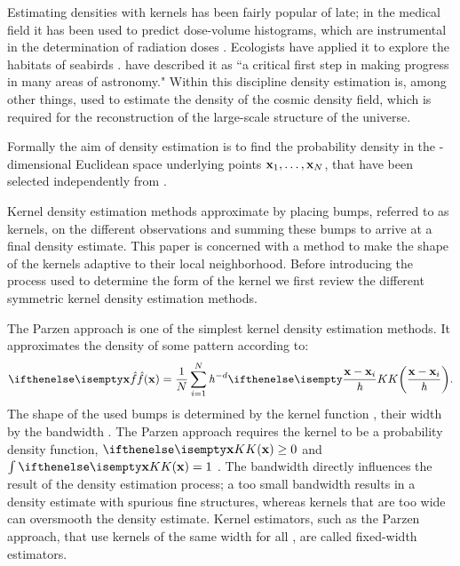 Estimating densities with kernels has been fairly popular of late; in the medical field it has been used to predict dose-volume histograms, which are instrumental in the determination of radiation doses \cite{SkarpmanDose2015}. Ecologists have applied it to explore the habitats of seabirds \cite{lees2016using}. \textcite{ferdosi2011comparison} have described it as ``a critical first step in making progress in many areas of astronomy."  Within this discipline  density estimation is, among other things, used to estimate the density of the cosmic density field, which is required for the reconstruction of the large-scale structure of the universe.

Formally the aim of density estimation is to find the probability density \varDensityFunction{\varPattern} in the \varDim-dimensional Euclidean space underlying \varNumPatterns points $\varPattern[1], \dotsc, \varPattern[\varNumPatterns]$, that have been selected independently from \varDensityFunction{\varPattern}. 

Kernel density estimation methods approximate \varDensityFunction{\varPattern} by placing bumps, referred to as kernels, on the different observations and summing these bumps to arrive at a final density estimate. This paper is concerned with a method to make the shape of the kernels adaptive to their local neighborhood. Before introducing the process used to determine the form of the kernel we first review the different symmetric kernel density estimation methods.

	The Parzen approach \cite{parzen1962estimation} is one of the simplest kernel density estimation methods. It approximates the density of some pattern \varPattern according to:
	\begin{equation}\label{eq:1:parzen}
		\varEstimatedDensityFunction{\varPattern} = \frac{1}{\varNumPatterns}\sum_{\itXis = 1}^{\varNumPatterns} \varBandwidth^{-\varDim}\varKernel{\frac{\varPattern - \varPattern[\itXis]}{\varBandwidth}}.
	\end{equation}
	The shape of the used bumps is determined by the kernel function \varKernel{\bullet}, their width by the bandwidth \varBandwidth. The Parzen approach requires the kernel to be a probability density function, \ie $\varKernel{\varPattern} \geq 0$ and $\int \varKernel{\varPattern} = 1$ \cite{silverman1986density}. 
	The bandwidth directly influences the result of the density estimation process; a too small bandwidth results in a density estimate with spurious fine structures, whereas kernels that are too wide can oversmooth the density estimate. Kernel estimators, such as the Parzen approach, that use kernels of the same width for all \varPattern[\itXis], are called fixed-width estimators.

